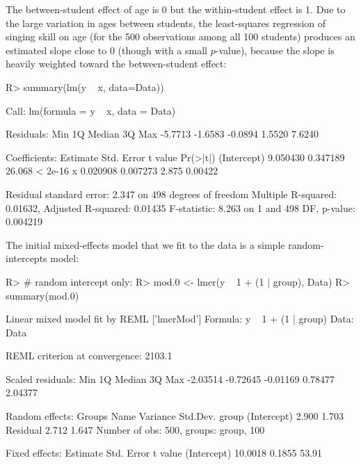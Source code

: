 \documentclass[
]{jss}
\begin{document}
\begin{CodeChunk}
\begin{figure}
f 100 students, and (b)--(e) several mixed models fit to the data}\label{fig:plot1}
\end{figure}
\end{CodeChunk}

The between-student effect of age is 0 but the within-student effect is
1. Due to the large variation in ages between students, the
least-squares regression of singing skill on age (for the 500
observations among all 100 students) produces an estimated slope close
to 0 (though with a small \(p\)-value), because the slope is heavily
weighted toward the between-student effect:

\begin{CodeChunk}
\begin{CodeInput}
R> summary(lm(y ~ x, data=Data))
\end{CodeInput}
\begin{CodeOutput}

Call:
lm(formula = y ~ x, data = Data)

Residuals:
    Min      1Q  Median      3Q     Max 
-5.7713 -1.6583 -0.0894  1.5520  7.6240 

Coefficients:
            Estimate Std. Error t value Pr(>|t|)
(Intercept) 9.050430   0.347189  26.068  < 2e-16
x           0.020908   0.007273   2.875  0.00422

Residual standard error: 2.347 on 498 degrees of freedom
Multiple R-squared:  0.01632,   Adjusted R-squared:  0.01435 
F-statistic: 8.263 on 1 and 498 DF,  p-value: 0.004219
\end{CodeOutput}
\end{CodeChunk}

The initial mixed-effects model that we fit to the data is a simple
random-intercepts model:

\begin{CodeChunk}
\begin{CodeInput}
R> # random intercept only:
R> mod.0 <- lmer(y ~ 1 + (1 | group), Data)
R> summary(mod.0)
\end{CodeInput}
\begin{CodeOutput}
Linear mixed model fit by REML ['lmerMod']
Formula: y ~ 1 + (1 | group)
   Data: Data

REML criterion at convergence: 2103.1

Scaled residuals: 
     Min       1Q   Median       3Q      Max 
-2.03514 -0.72645 -0.01169  0.78477  2.04377 

Random effects:
 Groups   Name        Variance Std.Dev.
 group    (Intercept) 2.900    1.703   
 Residual             2.712    1.647   
Number of obs: 500, groups:  group, 100

Fixed effects:
            Estimate Std. Error t value
(Intercept)  10.0018     0.1855   53.91
\end{CodeOutput}
\end{CodeChunk}
\end{document}
